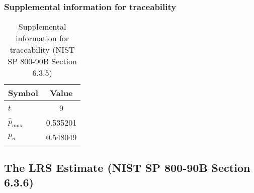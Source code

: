 \documentclass[a3paper,xelatex,english]{bxjsarticle}
\begin{document}
\subsubsection{Supplemental information for traceability}
\renewcommand{\arraystretch}{1.8}
\begin{table}[h]
\caption{Supplemental information for traceability (NIST SP 800-90B Section 6.3.5)}
\begin{center}
\begin{tabular}{|l|c|}
\hline 
\rowcolor{anotherlightblue} %
Symbol				& Value \\ \hline 
$t$				&        9\\ \hline 
$\hat{p}_{\textrm{max}}$ 			& 0.535201\\ \hline
$p_u$				& 0.548049\\ \hline
\end{tabular}
\end{center}
\end{table}
\renewcommand{\arraystretch}{1.4}
\clearpage
\subsection{The LRS Estimate (NIST SP 800-90B Section 6.3.6)}\label{sec:Binary636}
\end{document}
